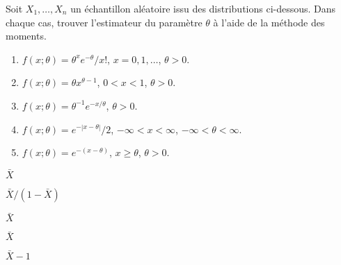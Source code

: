 \begin{exercice}
  \label{ex:ponctuelle:emm}
  Soit $X_1, \dots, X_n$ un échantillon aléatoire issu des
  distributions ci-dessous. Dans chaque cas, trouver l'estimateur du
  paramètre $\theta$ à l'aide de la méthode des moments.
  \begin{enumerate}
  \item $f(x; \theta) = \theta^x e^{-\theta}/x!$, $x = 0, 1, \dots$,
    $\theta > 0$.
  \item $f(x; \theta) = \theta x^{\theta - 1}$, $0 < x < 1$, $\theta >
    0$.
  \item $f(x; \theta) = \theta^{-1} e^{-x/\theta}$, $\theta > 0$.
  \item $f(x; \theta) = e^{-|x - \theta|}/2$, $-\infty < x <
    \infty$, $-\infty < \theta < \infty$.
  \item $f(x; \theta) = e^{-(x - \theta)}$, $x \geq \theta$, $\theta >
    0$.
  \end{enumerate}
  \begin{rep}
    \begin{inparaenum}
    \item $\bar{X}$
    \item $\bar{X}/(1 - \bar{X})$
    \item $\bar{X}$
    \item $\bar{X}$
    \item $\bar{X} - 1$
    \end{inparaenum}
  \end{rep}
  \begin{sol}
\end{sol}
\end{exercice}
